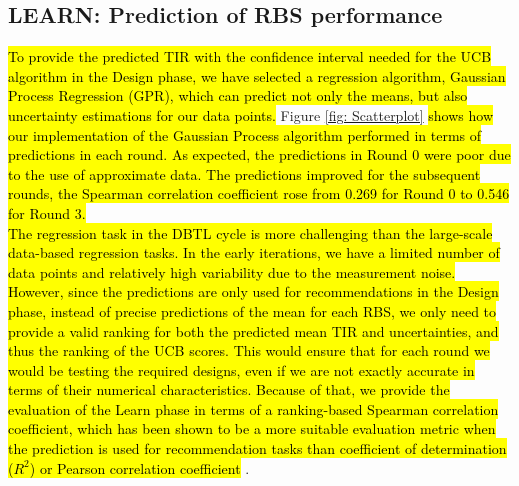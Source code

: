 \documentclass{article}
\begin{document}
\subsection{LEARN: Prediction of RBS performance}
\label{sec:gp-results}
\label{subsec: results LEARN}

\hl{To provide the predicted TIR with the confidence interval needed for the UCB algorithm in the Design phase, we have selected a regression algorithm, Gaussian Process Regression (GPR),  which can predict not only the means, but also uncertainty estimations for our data points. }
Figure \ref{fig: Scatterplot} \hl{shows how our implementation of the Gaussian Process algorithm performed in terms of predictions in each round. As expected, the predictions in Round 0 were poor due to the use of approximate data.
The predictions improved for the subsequent rounds,
the Spearman correlation coefficient rose from 0.269 for Round 0 to 0.546 for Round 3.}
\\

\hl{The regression task in the DBTL cycle is more challenging than the large-scale data-based regression tasks.
In the early iterations, we have a limited number of data points and relatively high variability due to the measurement noise.
However, since the predictions are only used for recommendations in the Design phase, instead of precise predictions of the mean for each RBS, we only need to provide a valid ranking for both the predicted mean TIR and uncertainties, and thus the ranking of the UCB scores.
This would ensure that for each round we would be testing the required designs, even if we are not exactly accurate in terms of their numerical characteristics.
Because of that, we provide the evaluation of the Learn phase in terms of a ranking-based Spearman correlation coefficient, which has been shown to be a more suitable evaluation metric when the prediction is used for recommendation tasks than coefficient of determination ($R^2$) or Pearson correlation coefficient}
\cite{Schober2018,  Kang2019}.\\
\end{document}
